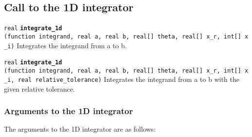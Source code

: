 \documentclass[
  10pt,
]{book}
\begin{document}
\hypertarget{call-to-the-1d-integrator}{%
\subsection{Call to the 1D integrator}\label{call-to-the-1d-integrator}}


\texttt{real} \textbf{\texttt{integrate\_1d}} \texttt{(function\ integrand,\ real\ a,\ real\ b,\ real{[}{]}\ theta,\ real{[}{]}\ x\_r,\ int{[}{]}\ x\_i)}\newline
Integrates the integrand from a to b.


\texttt{real} \textbf{\texttt{integrate\_1d}} \texttt{(function\ integrand,\ real\ a,\ real\ b,\ real{[}{]}\ theta,\ real{[}{]}\ x\_r,\ int{[}{]}\ x\_i,\ real\ relative\_tolerance)}\newline
Integrates the integrand from a to b with the given relative tolerance.

\hypertarget{arguments-to-the-1d-integrator}{%
\subsubsection{Arguments to the 1D integrator}\label{arguments-to-the-1d-integrator}}

The arguments to the 1D integrator are as follows:
\end{document}
